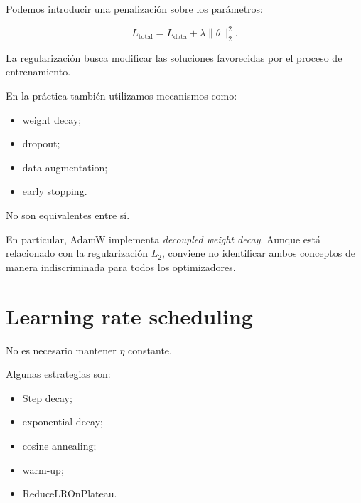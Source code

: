 \documentclass[
  letterpaper,
  DIV=11,
  numbers=noendperiod]{scrartcl}
\providecommand{\tightlist}{%
  \setlength{\itemsep}{0pt}\setlength{\parskip}{0pt}}
\begin{document}
Podemos introducir una penalización sobre los parámetros:

\[
L_{\mathrm{total}}
=
L_{\mathrm{data}}
+
\lambda\|\theta\|_2^2.
\]

La regularización busca modificar las soluciones favorecidas por el
proceso de entrenamiento.

En la práctica también utilizamos mecanismos como:

\begin{itemize}
\tightlist
\item
  weight decay;
\item
  dropout;
\item
  data augmentation;
\item
  early stopping.
\end{itemize}

No son equivalentes entre sí.

\begin{tcolorbox}[enhanced jigsaw, arc=.35mm, bottomrule=.15mm, bottomtitle=1mm, breakable, colback=white, colbacktitle=quarto-callout-note-color!10!white, colframe=quarto-callout-note-color-frame, coltitle=black, left=2mm, leftrule=.75mm, opacityback=0, opacitybacktitle=0.6, rightrule=.15mm, title=\textcolor{quarto-callout-note-color}{\faInfo}\hspace{0.5em}{Note}, titlerule=0mm, toprule=.15mm, toptitle=1mm]

En particular, AdamW implementa \emph{decoupled weight decay}. Aunque
está relacionado con la regularización \(L_2\), conviene no identificar
ambos conceptos de manera indiscriminada para todos los optimizadores.

\end{tcolorbox}

\section{Learning rate scheduling}\label{learning-rate-scheduling}

No es necesario mantener \(\eta\) constante.

Algunas estrategias son:

\begin{itemize}
\tightlist
\item
  Step decay;
\item
  exponential decay;
\item
  cosine annealing;
\item
  warm-up;
\item
  ReduceLROnPlateau.
\end{itemize}
\end{document}
